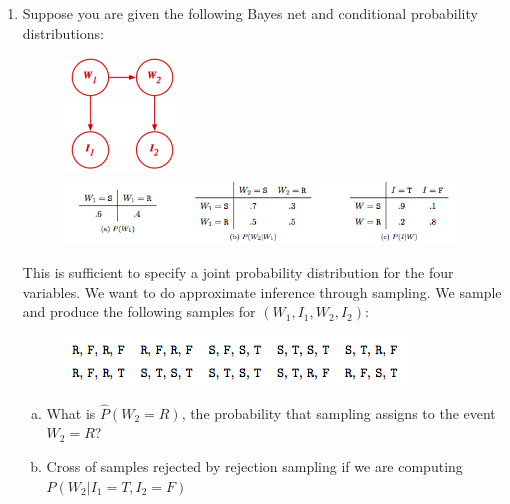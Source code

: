 \documentclass[11pt]{article}
\newif\ifsol
\begin{document}
\begin{enumerate}
\begin{enumerate}[a)]
        \ifsol
            {\color{blue} $f_2(U, V, W, +z)$, which has $3$ binary variables, has size $2^3 = 8$. Yes, elimination ordering of $X , U , T , V , W$ generates only factors of up to size $2^2 = 4$.}
        \else
            \vspace{2pt}
        \fi
    \end{enumerate}
    \clearpage
    \item Suppose you are given the following Bayes net and conditional probability distributions:
    \begin{figure}[ht]
        \centering
        \includegraphics[width=.1\textwidth]{figs/graphical}
        \includegraphics[width=.7\textwidth]{figs/tables}
    \end{figure}
    This is sufficient to specify a joint probability distribution for the four variables. We want to do approximate inference through sampling. We sample and produce the following samples for $(W_1, I_1, W_2, I_2)$:
    \begin{figure}[h]
        \centering
        \vspace{-1em}
        \includegraphics[width=.55\textwidth]{figs/samples}
        \vspace{-2em}
    \end{figure}
    \begin{enumerate}[a)]
        \item What is $\hat{P}(W_2=R)$, the probability that sampling assigns to the event $W_2 = R$?\\
        \ifsol
            \textcolor{blue}{$W_2 = R$ in 5 of the 10 samples, therefore the probability is 0.5.}
        \else
            \vspace{2em}
        \fi
        \item Cross of samples rejected by rejection sampling if we are computing $P(W_2|I_1=T, I_2=F)$\\
        \ifsol
            \begin{figure}[h]

\end{figure}
\end{enumerate}
\end{enumerate}
\end{document}
